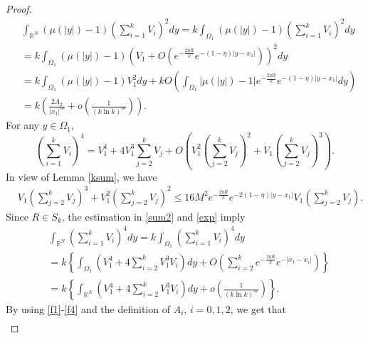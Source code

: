 \documentclass{amsart}
\theoremstyle{definition}
\theoremstyle{remark}
\numberwithin{equation}{section}
\begin{document}
\begin{proof}
\begin{equation}
\begin{aligned}\label{f3}
&\int_{\mathbb{R}^{N}}(\mu(|y|)-1) \left( \sum_{i=1}^k V_{i}\right)^{2}dy=k \int_{\Omega_{1}}(\mu(|y|)-1) \left( \sum_{i=1}^k V_{i}\right)^{2}dy \\
&=k \int_{\Omega_{1}}(\mu(|y|)-1)\left(V_1+O\left(e^{-\frac{2\eta R}{k}} e^{-(1-\eta)\left|y-x_{1}\right|}\right)\right)^{2}dy \\
&=k \int_{\Omega_{1}}(\mu(|y|)-1) V_1^{2}dy+k O\left(\int_{\Omega_{1}}|\mu(|y|)-1| e^{-\frac{2\eta R}{k}} e^{-(1-\eta)\left|y-x_{1}\right|}dy\right) \\
&=k\left(\frac{2A_2}{\left|x_{1}\right|^{m}}+o\left(\frac{1}{(k\ln k)^m}\right)\right).
\end{aligned}
\end{equation}
For any $y \in \Omega_{1}$,
\begin{equation}
\left( \sum_{i=1}^k V_{i}\right)^{4}=V_1^{4}+4 V_1^{3} \sum_{j=2}^{k} V_j+O\left(V_1^{2}\left(\sum_{j=2}^{k} V_j\right)^{2}+V_1\left(\sum_{j=2}^{k} V_j\right)^{3}\right).
\end{equation}
In view of Lemma \ref{ksum}, we have
\begin{equation*}
\begin{aligned}
&V_1\left(\sum_{j=2}^{k} V_j\right)^{3}+V_1^{2}\left(\sum_{j=2}^{k} V_j\right)^{2} 
  \leq 16M^2  e^{-\frac{2\eta R}{k}} e^{-2(1-\eta)\left|y-x_{1}\right|} V_1 \left( \sum_{j=2}^{k} V_j \right).
\end{aligned}
\end{equation*}
Since $R\in S_k$, the estimation in \eqref{sum2} and \eqref{exp} imply 
\begin{equation}
\begin{aligned}\label{f4}
&\int_{\mathbb{R}^{N}} \left( \sum_{i=1}^k V_{i}\right)^{4}dy=k \int_{\Omega_{1}} \left( \sum_{i=1}^k V_{i}\right)^{4}dy \\
&=k \left\{\int_{\Omega_{1}}\left(V_1^{4}+4 \sum_{i=2}^{k} V_1^{3} V_i\right)dy+O\left(\sum_{i=2}^{k} e^{-   \frac{2\eta R}{k}} e^{-\left|x_{1}-x_{i}\right|}\right) \right\}\\
&=k\left\{\int_{\mathbb{R}^{N}}\left( V_1^{4}+4 \sum_{i=2}^{k}  V_1^{3} V_i\right)dy+o\left( \frac{1}{(k\ln k)^m}\right)\right\}.
\end{aligned}
\end{equation}
By using \eqref{f1}-\eqref{f4} and the definition of $A_i$, $i=0,1,2$, we get that 
\begin{equation}
\begin{aligned}\label{f5}

\end{aligned}
\end{equation}
\end{proof}
\end{document}
